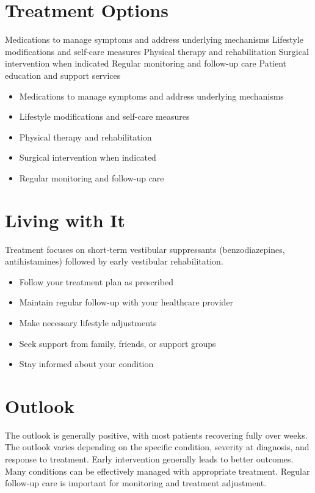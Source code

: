 \section{Treatment Options}
Medications to manage symptoms and address underlying mechanisms Lifestyle modifications and self-care measures Physical therapy and rehabilitation Surgical intervention when indicated Regular monitoring and follow-up care Patient education and support services

\begin{itemize}[noitemsep]
  \item Medications to manage symptoms and address underlying mechanisms
  \item Lifestyle modifications and self-care measures
  \item Physical therapy and rehabilitation
  \item Surgical intervention when indicated
  \item Regular monitoring and follow-up care
\end{itemize}
\section{Living with It}
Treatment focuses on short-term vestibular suppressants (benzodiazepines, antihistamines) followed by early vestibular rehabilitation.

\begin{itemize}[noitemsep]
  \item Follow your treatment plan as prescribed
  \item Maintain regular follow-up with your healthcare provider
  \item Make necessary lifestyle adjustments
  \item Seek support from family, friends, or support groups
  \item Stay informed about your condition
\end{itemize}
\section{Outlook}
The outlook is generally positive, with most patients recovering fully over weeks. The outlook varies depending on the specific condition, severity at diagnosis, and response to treatment. Early intervention generally leads to better outcomes. Many conditions can be effectively managed with appropriate treatment. Regular follow-up care is important for monitoring and treatment adjustment.
